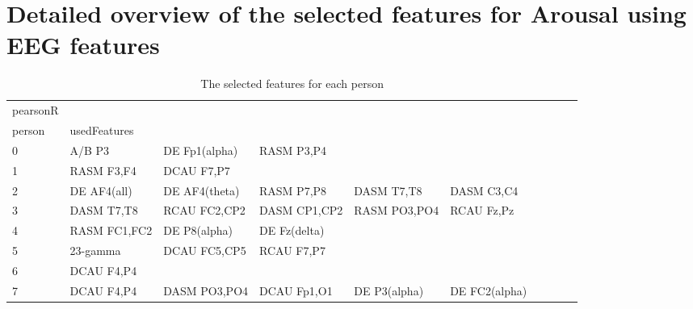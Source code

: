 \chapter{Detailed overview of the selected features for Arousal using EEG features}

\begin{landscape}
\begin{table}[]
\centering
\caption{The selected features for each person}
\begin{tabular}{l|llllllll}
pearsonR &                &                &                &                &                &                &                &                &               &              \\
person   & usedFeatures   &                &                &                &                &                &                &                &               &              \\
0        & A/B P3         & DE Fp1(alpha)  & RASM P3,P4     &                &                &                &                &                &               &              \\
1        & RASM F3,F4     & DCAU F7,P7     &                &                &                &                &                &                &               &              \\
2        & DE AF4(all)    & DE AF4(theta)  & RASM P7,P8     & DASM T7,T8     & DASM C3,C4     &                &                &                &               &              \\
3        & DASM T7,T8     & RCAU FC2,CP2   & DASM CP1,CP2   & RASM PO3,PO4   & RCAU Fz,Pz     &                &                &                &               &              \\
4        & RASM FC1,FC2   & DE P8(alpha)   & DE Fz(delta)   &                &                &                &                &                &               &              \\
5        & 23-gamma       & DCAU FC5,CP5   & RCAU F7,P7     &                &                &                &                &                &               &              \\
6        & DCAU F4,P4     &                &                &                &                &                &                &                &               &              \\
7        & DCAU F4,P4     & DASM PO3,PO4   & DCAU Fp1,O1    & DE P3(alpha)   & DE FC2(alpha)  &                &                &                &               &              \\

\end{tabular}
\end{table}
\end{landscape}
